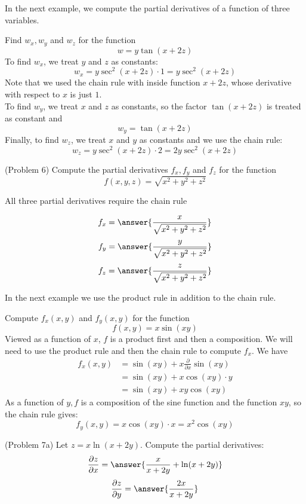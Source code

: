 \documentclass[handout]{ximera}
\begin{document}
In the next example, we compute the partial derivatives of a function of three variables.

\begin{example}[Example 6]
Find $w_x, w_y$ and $w_z$ for the function
\[
w = y\tan(x+2z)
\]
To find $w_x$, we treat $y$ and $z$ as constants:
\[
w_x = y\sec^2(x+2z) \cdot 1 = y\sec^2(x+2z)
\]
Note that we used the chain rule with inside function $x + 2z$, whose derivative with respect to $x$ is just $1$.\\
To find $w_y$, we treat $x$ and $z$ as constants, so the factor $\tan(x+2z)$ is treated as constant and
\[
w_y = \tan(x+2z)
\]
Finally, to find $w_z$, we treat $x$ and $y$ as constants and we use the chain rule:
\[
w_z = y\sec^2(x+2z) \cdot 2 = 2y\sec^2(x+2z)
\]
\end{example}

\begin{problem}(Problem 6)
Compute the partial derivatives $f_x, f_y$ and $f_z$ for the function
\[
f(x,y,z) = \sqrt{x^2 + y^2 + z^2}
\]
\begin{hint}
All three partial derivatives require the chain rule
\end{hint}
\[
f_x = \answer{\frac{x}{\sqrt{x^2 + y^2 + z^2}}}
\]
\[
f_y = \answer{\frac{y}{\sqrt{x^2 + y^2 + z^2}}}
\]
\[
f_z = \answer{\frac{z}{\sqrt{x^2 + y^2 + z^2}}}
\]

\end{problem}

In the next example we use the product rule in addition to the chain rule.

\begin{example}[Example 7]
Compute $f_x(x,y)$ and $f_y(x,y)$ for the function 
\[
f(x,y) = x\sin(xy)
\]
Viewed as a function of $x$, $f$ is a product first and then a composition. We will need to use the product rule and then
the chain rule to compute $f_x$.
We have
\begin{align*}
f_x(x,y) &= \sin(xy) + x \frac{\partial}{\partial x} \sin(xy)\\
         & = \sin(xy) + x \cos(xy) \cdot y\\
         & = \sin(xy) + xy \cos(xy)
\end{align*}
As a function of $y, f$ is a composition of the sine function and the function $xy$, so the chain rule gives:
\[
f_y(x,y) = x \cos(xy) \cdot x = x^2 \cos(xy)
\]

\end{example}


\begin{problem}(Problem 7a)
Let $z = x\ln(x+ 2y)$. Compute the partial derivatives:
\[
\frac{\partial z}{\partial x} = \answer{\frac{x}{x+2y} + \ln(x+2y)}
\]
\[
\frac{\partial z}{\partial y} = \answer{\frac{2x}{x+2y}}
\]
\end{problem}
\end{document}
